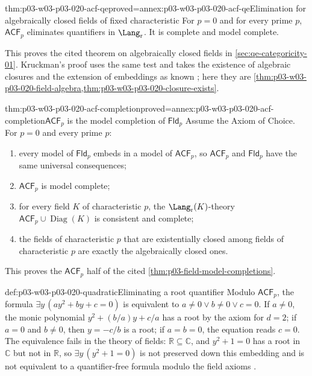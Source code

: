 \begin{hbtheorem}{thm:p03-w03-p03-020-acf-qe}{proved=annex:p03-w03-p03-020-acf-qe}{Elimination for algebraically closed fields of fixed characteristic}
For \(p=0\) and for every prime \(p\), \(\mathsf{ACF}_p\) eliminates
quantifiers in \(\Lang_{\mathrm r}\). It is complete and model complete.
\end{hbtheorem}

This proves the cited theorem on algebraically closed fields in
\cref{sec:qe-categoricity-01}. Kruckman's proof uses the same test and takes
the existence of algebraic closures and the extension of embeddings as known
\cite[Theorem~2.27, p.~20]{Kruckman2020}; here they are
\cref{thm:p03-w03-p03-020-field-algebra,thm:p03-w03-p03-020-closure-exists}.

\begin{hbtheorem}{thm:p03-w03-p03-020-acf-completion}{proved=annex:p03-w03-p03-020-acf-completion}{\(\mathsf{ACF}_p\) is the model completion of \(\mathsf{Fld}_p\)}
Assume the Axiom of Choice. For \(p=0\) and every prime \(p\):
\begin{enumerate}
\item every model of \(\mathsf{Fld}_p\) embeds in a model of
  \(\mathsf{ACF}_p\), so \(\mathsf{ACF}_p\) and \(\mathsf{Fld}_p\) have
  the same universal consequences;
\item \(\mathsf{ACF}_p\) is model complete;
\item for every field \(K\) of characteristic \(p\), the
  \(\Lang_{\mathrm r}(K)\)-theory
  \(\mathsf{ACF}_p\cup\operatorname{Diag}(K)\) is consistent and complete;
\item the fields of characteristic \(p\) that are existentially closed
  among fields of characteristic \(p\) are exactly the algebraically closed
  ones.
\end{enumerate}
\end{hbtheorem}

This proves the \(\mathsf{ACF}_p\) half of the cited
\cref{thm:p03-field-model-completions}.

\begin{hbexample}{def:p03-w03-p03-020-quadratic}{Eliminating a root quantifier}
Modulo \(\mathsf{ACF}_p\), the formula \(\exists y\,(ay^2+by+c=0)\) is
equivalent to \(a\ne0\lor b\ne0\lor c=0\). If \(a\ne0\), the monic
polynomial \(y^2+(b/a)y+c/a\) has a root by the axiom for \(d=2\); if
\(a=0\) and \(b\ne0\), then \(y=-c/b\) is a root; if \(a=b=0\), the
equation reads \(c=0\). The equivalence fails in the theory of fields:
\(\mathbb R\subseteq\mathbb C\), and \(y^2+1=0\) has a root in
\(\mathbb C\) but not in \(\mathbb R\), so
\(\exists y\,(y^2+1=0)\) is not preserved down this embedding and is not
equivalent to a quantifier-free formula modulo the field axioms
\cite[Example~2.21, p.~16]{Kruckman2020}.
\end{hbexample}

